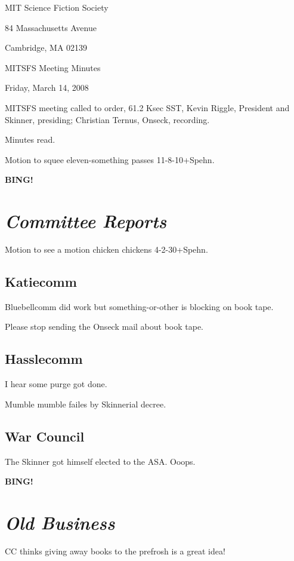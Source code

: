 \documentclass[10pt]{article}
\newcommand{\bing}{{\bf BING!} }
\newcommand{\goto}[1]{\bing \vskip 12pt \section*{{\em{#1}}}}
\begin{document}
\begin{center}

MIT Science Fiction Society

84 Massachusetts Avenue

Cambridge, MA 02139

\vspace{12pt}

MITSFS Meeting Minutes

Friday, March 14, 2008

\end{center}

\vspace{18pt}

\setlength{\parskip}{6pt}

\noindent
MITSFS meeting called to order, 61.2 Ksec SST,
Kevin Riggle, President and Skinner, presiding; Christian Ternus, Onseck, recording.

Minutes read.

Motion to squee eleven-something passes 11-8-10+Spehn.

\BING

\goto{Committee Reports}

Motion to see a motion chicken chickens 4-2-30+Spehn.

\subsection*{Katiecomm}

Bluebellcomm did work but something-or-other is blocking on book tape.

Please stop sending the Onseck mail about book tape.

\subsection*{Hasslecomm}

I hear some purge got done.

Mumble mumble failes by Skinnerial decree.

\subsection*{War Council}

The Skinner got himself elected to the ASA.  Ooops.

\goto{Old Business}

CC thinks giving away books to the prefrosh is a great idea!
\end{document}
